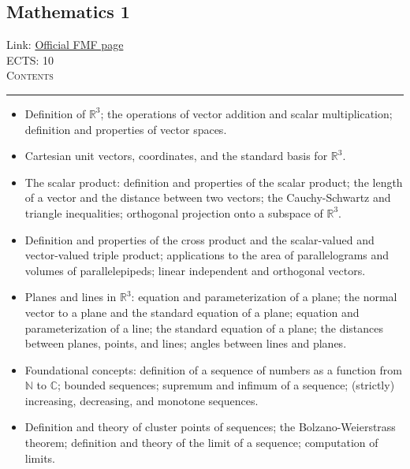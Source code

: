 \documentclass[11pt, a4paper]{article}
\newenvironment{course}[3]{
\subsection{#1}%
Link: \href{#2}{Official FMF page}\\%
ECTS: #3%
\vspace{1ex}
\\
{\large \textsc{Contents}}\\[-0.9ex]%
\rule{\textwidth}{0.5pt}
\vspace{-3ex}
}
{}
\newenvironment{chapter}[1]{
\begin{tcolorbox}[title=#1, breakable]
}
{\end{tcolorbox}}
\begin{document}
\begin{course}{Mathematics 1}{https://www.fmf.uni-lj.si/en/study-physics/programmes/1fiz/2020/7000777/courses/520/}{10}
\begin{chapter}{Numbers}
\begin{itemize}
        \end{itemize}
    \end{chapter}

    \begin{chapter}{Geometry of the Euclidean space $ \mathbb{R}^{3} $}
        \begin{itemize}
        
            \item Definition of $ \mathbb{R}^{3} $; the operations of vector addition and scalar multiplication; definition and properties of vector spaces.

            \item Cartesian unit vectors, coordinates, and the standard basis for $ \mathbb{R}^{3} $.

            \item The scalar product: definition and properties of the scalar product; the length of a vector and the distance between two vectors; the Cauchy-Schwartz and triangle inequalities; orthogonal projection onto a subspace of $ \mathbb{R}^{3} $.

            \item Definition and properties of the cross product and the scalar-valued and vector-valued triple product; applications to the area of parallelograms and volumes of parallelepipeds; linear independent and orthogonal vectors.
        
            \item Planes and lines in $ \mathbb{R}^{3} $: equation and parameterization of a plane; the normal vector to a plane and the standard equation of a plane; equation and parameterization of a line; the standard equation of a plane; the distances between planes, points, and lines; angles between lines and planes.

        \end{itemize}
    \end{chapter}

    \begin{chapter}{Number sequences}
        \begin{itemize}
        
            \item Foundational concepts: definition of a sequence of numbers as a function from $ \mathbb{N} $ to $ \mathbb{C} $; bounded sequences; supremum and infimum of a sequence; (strictly) increasing, decreasing, and monotone sequences.

            \item Definition and theory of cluster points of sequences; the Bolzano-Weierstrass theorem;
            definition and theory of the limit of a sequence; computation of limits.


\end{itemize}
\end{chapter}
\end{course}
\end{document}

